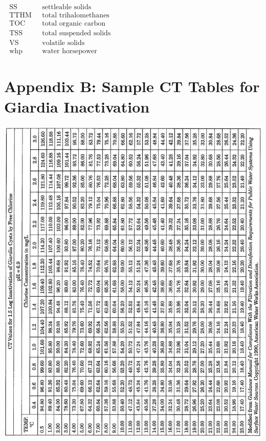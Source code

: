 \documentclass[10pt]{article}
\begin{document}
$\begin{array}{ll}\text { SS } & \text { settleable solids } \\ \text { TTHM } & \text { total trihalomethanes } \\ \text { TOC } & \text { total organic carbon } \\ \text { TSS } & \text { total suspended solids } \\ \text { VS } & \text { volatile solids } \\ \text { whp } & \text { water horsepower }\end{array}$

\section{Appendix B: Sample CT Tables for Giardia Inactivation}
\includegraphics[max width=\textwidth]{2022_11_10_d6923b5a412978ed01fcg-61}
\end{document}

